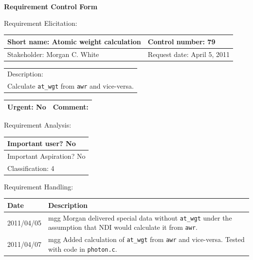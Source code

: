 \begin{center}\Large\bf
Requirement Control Form
\end{center}
\vspace{24pt}

Requirement Elicitation:

\begin{tabular}{|p{211pt}|p{211pt}|} \hline
Short name: Atomic weight calculation & Control number: 79\\ \hline
Stakeholder: Morgan C. White & Request date: April 5, 2011\\
\end{tabular}
\begin{tabular}{|p{433pt}|} \hline
Description: \\ 
Calculate \texttt{at\_wgt} from \texttt{awr} and vice-versa.\\
\hline
\end{tabular} 
\begin{tabular}{|p{211pt}|p{211pt}|} \hline
Urgent: No & Comment: \\ \hline
\end{tabular}

\vspace{24pt}

Requirement Analysis:

\begin{tabular}{|p{433pt}|} \hline
Important user? No \\ \hline
Important Aspiration? No \\ \hline
Classification: 4 \\ \hline
\end{tabular}
\vspace{24pt}

Requirement Handling:

\begin{tabular}{|p{72pt}|p{351pt}|} \hline
Date & Description \\ \hline
2011/04/05 & mgg Morgan delivered special data without \texttt{at\_wgt} under
the assumption that NDI would calculate it from
\texttt{awr}. \\ \hline
2011/04/07 & mgg Added calculation of \texttt{at\_wgt} from
\texttt{awr} and vice-versa.  Tested with code in \texttt{photon.c}.
\\ \hline
\end{tabular}
